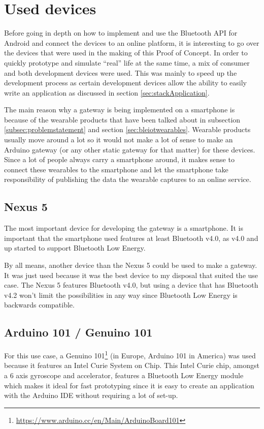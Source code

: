 \documentclass[pdftex,a4paper,12pt,twoside]{report}
\begin{document}
\section{Used devices}
\label{sec:devices}
Before going in depth on how to implement and use the Bluetooth API for Android and connect the devices to an online platform, it is interesting to go over the devices that were used in the making of this Proof of Concept. In order to quickly prototype and simulate ``real'' life at the same time, a mix of consumer and both development devices were used. This was mainly to speed up the development process as certain development devices allow the ability to easily write an application as discussed in section \ref{sec:stackApplication}.

The main reason why a gateway is being implemented on a smartphone is because of the wearable products that have been talked about in subsection \ref{subsec:problemstatement} and section \ref{sec:bleiotwearables}. Wearable products usually move around a lot so it would not make a lot of sense to make an Arduino gateway (or any other static gateway for that matter) for these devices. Since a lot of people always carry a smartphone around, it makes sense to connect these wearables to the smartphone and let the smartphone take responsibility of publishing the data the wearable captures to an online service.

\subsection{Nexus 5}
\label{subsec:nexus}
The most important device for developing the gateway is a smartphone. It is important that the smartphone used features at least Bluetooth v4.0, as v4.0 and up started to support Bluetooth Low Energy.

By all means, another device than the Nexus 5 could be used to make a gateway. It was just used because it was the best device to my disposal that suited the use case. The Nexus 5 features Bluetooth v4.0, but using a device that has Bluetooth v4.2 won't limit the possibilities in any way since Bluetooth Low Energy is backwards compatible.

\subsection{Arduino 101 / Genuino 101}
\label{subsec:arduino101}
For this use case, a Genuino 101\footnote{\url{https://www.arduino.cc/en/Main/ArduinoBoard101}} (in Europe, Arduino 101 in America) was used because it features an Intel Curie System on Chip. This Intel Curie chip, amongst a 6 axis gyroscope and accelerator, features a Bluetooth Low Energy module which makes it ideal for fast prototyping since it is easy to create an application with the Arduino IDE without requiring a lot of set-up.
\end{document}
